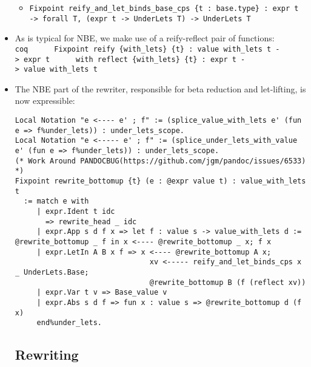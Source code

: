 \begin{itemize}
  \begin{itemize}
  \tightlist
  \item
    \texttt{Fixpoint\ reify\_and\_let\_binds\_base\_cps\ \{t\ :\ base.type\}\ :\ expr\ t\ -\textgreater{}\ forall\ T,\ (expr\ t\ -\textgreater{}\ UnderLets\ T)\ -\textgreater{}\ UnderLets\ T}
  \end{itemize}
\item
  As is typical for NBE, we make use of a reify-reflect pair of
  functions:
  \texttt{coq\ \ \ \ \ \ Fixpoint\ reify\ \{with\_lets\}\ \{t\}\ :\ value\textquotesingle{}\ with\_lets\ t\ -\textgreater{}\ expr\ t\ \ \ \ \ \ with\ reflect\ \{with\_lets\}\ \{t\}\ :\ expr\ t\ -\textgreater{}\ value\textquotesingle{}\ with\_lets\ t}
\item
  The NBE part of the rewriter, responsible for beta reduction and
  let-lifting, is now expressible:

\begin{verbatim}
Local Notation "e <---- e' ; f" := (splice_value_with_lets e' (fun e => f%under_lets)) : under_lets_scope.
Local Notation "e <----- e' ; f" := (splice_under_lets_with_value e' (fun e => f%under_lets)) : under_lets_scope.
(* Work Around PANDOCBUG(https://github.com/jgm/pandoc/issues/6533) *)
Fixpoint rewrite_bottomup {t} (e : @expr value t) : value_with_lets t
  := match e with
     | expr.Ident t idc
       => rewrite_head _ idc
     | expr.App s d f x => let f : value s -> value_with_lets d := @rewrite_bottomup _ f in x <---- @rewrite_bottomup _ x; f x
     | expr.LetIn A B x f => x <---- @rewrite_bottomup A x;
                               xv <----- reify_and_let_binds_cps x _ UnderLets.Base;
                               @rewrite_bottomup B (f (reflect xv))
     | expr.Var t v => Base_value v
     | expr.Abs s d f => fun x : value s => @rewrite_bottomup d (f x)
     end%under_lets.
\end{verbatim}

  \hypertarget{rewriting}{%
  \subsection{Rewriting}\label{rewriting}}

  \hypertarget{there-are-three-parts-and-one-additional-detail-to-rewriting}{%
}
\end{itemize}
